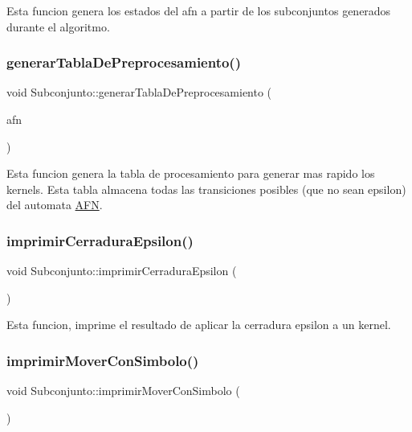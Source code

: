 Esta funcion genera los estados del afn a partir de los subconjuntos generados durante el algoritmo. \mbox{\label{class_subconjunto_a41444a0c990781527ae37a2e4374a516}} 
\subsubsection{\texorpdfstring{generar\+Tabla\+De\+Preprocesamiento()}{generarTablaDePreprocesamiento()}}
{\footnotesize\ttfamily void Subconjunto\+::generar\+Tabla\+De\+Preprocesamiento (\begin{DoxyParamCaption}\item[{\hyperlink{class_a_f_n}{A\+FN}}]{afn }\end{DoxyParamCaption})}

Esta funcion genera la tabla de procesamiento para generar mas rapido los kernels. Esta tabla almacena todas las transiciones posibles (que no sean epsilon) del automata \hyperlink{class_a_f_n}{A\+FN}. \mbox{\label{class_subconjunto_a53a556d6ce862720294cb2006d446717}} 
\subsubsection{\texorpdfstring{imprimir\+Cerradura\+Epsilon()}{imprimirCerraduraEpsilon()}}
{\footnotesize\ttfamily void Subconjunto\+::imprimir\+Cerradura\+Epsilon (\begin{DoxyParamCaption}{ }\end{DoxyParamCaption})}

Esta funcion, imprime el resultado de aplicar la cerradura epsilon a un kernel. \mbox{\label{class_subconjunto_a044116b31b133c7e15b75f5260424a07}} 
\subsubsection{\texorpdfstring{imprimir\+Mover\+Con\+Simbolo()}{imprimirMoverConSimbolo()}}
{\footnotesize\ttfamily void Subconjunto\+::imprimir\+Mover\+Con\+Simbolo (\begin{DoxyParamCaption}{ }\end{DoxyParamCaption})}

